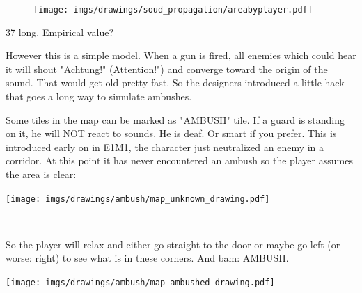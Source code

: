 \par
\begin{figure}[H]
 \centering
 \texttt{[image: imgs/drawings/soud\_propagation/areabyplayer.pdf]}
\end{figure}
\par
37 long. Empirical value?\\
\par








However this is a simple model. When a gun is fired, all enemies which could hear it will shout "Achtung!" (Attention!") and converge toward the origin of the sound. That would get old pretty fast. So the designers introduced a little hack that goes a long way to simulate ambushes.

\par
\begin{figure}[H]
 \centering
\end{figure}
\par

\begin{minipage}{0.6\textwidth}
Some tiles in the map can be marked as "AMBUSH" tile. If a guard is standing on it, he will NOT react to sounds. He is deaf. Or smart if you prefer. This is introduced early on in E1M1, the character just neutralized an enemy in a corridor. At this point it has never encountered an ambush so the player assumes the area is clear:\\
\end{minipage}
\begin{minipage}{0.4\textwidth}
\begin{flushright}
\texttt{[image: imgs/drawings/ambush/map\_unknown\_drawing.pdf]}
\end{flushright}  
\end{minipage}
\noindent
\\


\par
\begin{figure}[H]
 \centering
\end{figure}
\par
\begin{minipage}{0.6\textwidth}
So the player will relax and either go straight to the door or maybe go left (or worse: right) to see what is in these corners. And bam: AMBUSH.
\end{minipage}
\begin{minipage}{0.4\textwidth}
\begin{flushright}
\texttt{[image: imgs/drawings/ambush/map\_ambushed\_drawing.pdf]}
\end{flushright}
\end{minipage}
\noindent
\\


